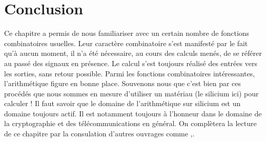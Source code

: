 \section{Conclusion}
Ce chapitre a permis de nous familiariser avec un certain nombre de fonctions combinatoires usuelles. Leur caractère combinatoire s'est manifesté par le fait qu'à aucun moment, il n'a été nécessaire, au cours
des calculs menés, de se référer au passé des signaux en présence. Le calcul s'est toujours réalisé des entrées vers les sorties, sans retour possible.
Parmi les fonctions combinatoires intéressantes, l'arithmétique figure en bonne place. Souvenons nous que c'est bien par ces procédés que nous sommes en mesure
d'utiliser un matériau (le silicium ici) pour calculer ! Il faut savoir que le domaine de l'arithmétique sur silicium est un domaine toujours actif. Il est notamment
toujours à l'honneur dans le domaine de la cryptographie et des télécommunications en général.
On complètera la lecture de ce chapitre par la consulation d'autres ouvrages comme \cite{Mano:2001:DD:559360},\cite{Clements:2000:PCH:518138}.
